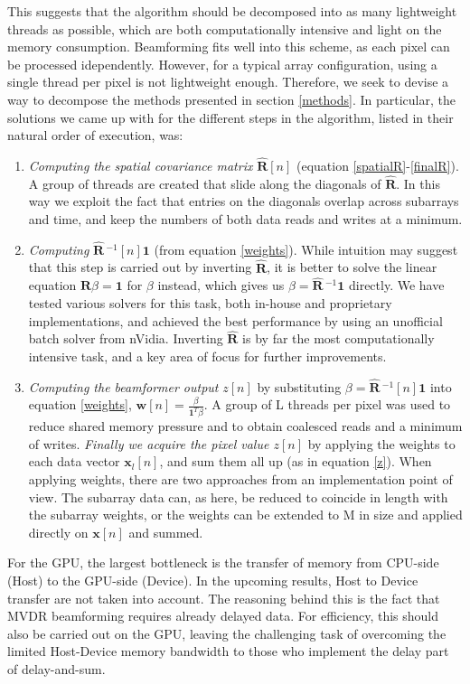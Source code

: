 \documentclass[10pt,a4paper]{article}
\newcommand\T{^{\scriptscriptstyle T}}
\renewcommand\vec[1]{\boldsymbol{#1}}
\newcommand\mat[1]{\boldsymbol{#1}}
\newcommand\1{\vec 1}
\newcommand*\x{\vec x}
\newcommand*\R{\mat R}
\newcommand*\eR{\mat{\hat R}}
\newcommand*\eRi{\hat{\mat R}\,\!^{-1}}
\begin{document}
This suggests that the algorithm should be decomposed into as many lightweight threads as possible, which are both computationally intensive and light on the memory consumption. Beamforming fits well into this scheme, as each pixel can be processed idependently. However, for a typical array configuration, using a single thread per pixel is not lightweight enough. Therefore, we seek to devise a way to decompose the methods presented in section \ref{methods}. In particular, the solutions we came up with for the different steps in the algorithm, listed in their natural order of execution, was:
\begin{enumerate}
\item \emph{Computing the spatial covariance matrix} $\eR[n]$ (equation \ref{spatialR}-\ref{finalR}). A group of threads are created that slide along the diagonals of $\eR$. In this way we exploit the fact that entries on the diagonals overlap across subarrays and time, and keep the numbers of both data reads and writes at a minimum.
\item \emph{Computing} $\eRi[n]\1$ (from equation \ref{weights}). While intuition may suggest that this step is carried out by inverting $\eR$, it is better to solve the linear equation $\R\beta = \1$ for $\beta$ instead, which gives us $\beta = \eRi\1$ directly. We have tested various solvers for this task, both in-house and proprietary implementations, and achieved the best performance by using an unofficial batch solver from nVidia. Inverting $\eR$ is by far the most computationally intensive task, and a key area of focus for further improvements.
\item \emph{Computing the beamformer output} $z[n]$ by substituting $\beta = \eRi[n]\1$ into equation \ref{weights}, $\vec w[n] = \frac{\beta}{\1\T\beta}$. A group of L threads per pixel was used to reduce shared memory pressure and to obtain coalesced reads and a minimum of writes. \emph{Finally we acquire the pixel value $z[n]$} by applying the weights to each data vector $\x_l[n]$, and sum them all up (as in equation \ref{z}). When applying weights, there are two approaches from an implementation point of view. The subarray data can, as here, be reduced to coincide in length with the subarray weights, or the weights can be extended to M in size and applied directly on $\x[n]$ and summed.  
\end{enumerate}
For the GPU, the largest bottleneck is the transfer of memory from CPU-side (Host) to the GPU-side (Device). In the upcoming results, Host to Device transfer are not taken into account. The reasoning behind this is the fact that \gls{MVDR} beamforming requires already delayed data. For efficiency, this should also be carried out on the GPU, leaving the challenging task of overcoming the limited Host-Device memory bandwidth to those who implement the delay part of delay-and-sum. 
\end{document}
